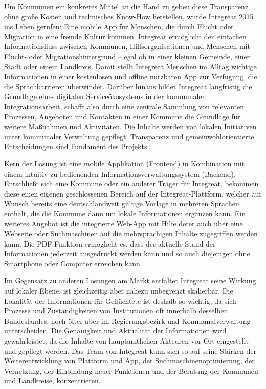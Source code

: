 \documentclass[12pt, a4paper]{article} %
\begin{document}
Um Kommunen ein konkretes Mittel an die Hand zu geben diese Transparenz
ohne große Kosten und technisches Know-How herstellen, wurde Integreat
2015 ins Leben gerufen: Eine mobile App für Menschen, die durch Flucht
oder Migration in eine fremde Kultur kommen. Integreat ermöglicht den
einfachen Informationsfluss zwischen Kommunen, Hilfsorganisationen und
Menschen mit Flucht- oder Migrationshintergrund – egal ob in einer
kleinen Gemeinde, einer Stadt oder einem Landkreis. Damit stellt
Integreat Menschen im Alltag wichtige Informationen in einer kostenlosen
und offline nutzbaren App zur Verfügung, die die Sprachbarrieren
überwindet. Darüber hinaus bildet Integreat langfristig die Grundlage
eines digitalen Serviceökosystems in der kommunalen Integrationsarbeit,
schafft also durch eine zentrale Sammlung von relevanten Prozessen,
Angeboten und Kontakten in einer Kommune die Grundlage für weitere
Maßnahmen und Aktivitäten. Die Inhalte werden von lokalen Initiativen
unter kommunaler Verwaltung gepflegt. Transparenz und
gemeinwohlorientierte Entscheidungen sind Fundament des Projekts.

Kern der Lösung ist eine mobile Applikation (Frontend) in Kombination
mit einem intuitiv zu bedienenden Informationsverwaltungssystem
(Backend). Entschließt sich eine Kommune oder ein anderer Träger für
Integreat, bekommen diese einen eigenen geschlossenen Bereich auf der
Integreat-Plattform, welcher auf Wunsch bereits eine deutschlandweit
gültige Vorlage in mehreren Sprachen enthält, die die Kommune dann um
lokale Informationen ergänzen kann. Ein weiteres Angebot ist die
integrierte Web-App mit Hilfe derer auch über eine Webseite oder
Suchmaschinen auf die mehrsprachigen Inhalte zugegriffen werden kann.
Die PDF-Funktion ermöglicht es, dass der aktuelle Stand der
Informationen jederzeit ausgedruckt werden kann und so auch diejenigen
ohne Smartphone oder Computer erreichen kann.

Im Gegensatz zu anderen Lösungen am Markt entfaltet Integreat seine
Wirkung auf lokaler Ebene, ist gleichzeitig aber nahezu unbegrenzt
skalierbar. Die Lokalität der Informationen für Geflüchtete ist deshalb
so wichtig, da sich Prozesse und Zuständigkeiten von Institutionen oft
innerhalb desselben Bundeslandes, noch öfter aber im Regierungsbezirk
und Kommunalverwaltung unterscheiden. Die Genauigkeit und Aktualität der
Informationen wird gewährleistet, da die Inhalte von hauptamtlichen
Akteuren vor Ort eingestellt und gepflegt werden. Das Team von Integreat
kann sich so auf seine Stärken der Weiterentwicklung von Plattform und
App, der Suchmaschinenoptimierung, der Vernetzung, der Einbindung neuer
Funktionen und der Beratung der Kommunen und Landkreise, konzentrieren.
\end{document}
